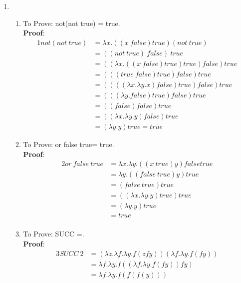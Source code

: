 \documentclass[11pt]{article}
\begin{document}
\begin{enumerate}
\item 
\begin{enumerate}
    \item To Prove: not(not true) = true.\\
          \textbf{Proof}: \begin{alignat*}{1}
                 not(not\:true)
                 &=  \lambda x.((x\:false)true)(not\:true) \\
                 &= ((not\:true)\:false)\:true \\
                &=  ((\lambda x.((x\:false) true) true)false) true \\
                 &= (((true\:false) true) false)true\\
                 &= ((((\lambda x. \lambda y.x) false) true)false) true\\
                &= (((\lambda y.false) true) false)true \\
                &= ((false) false) true \\
                &= ((\lambda x.\lambda y.y) false) true\\
                &= (\lambda y.y) true = true 
                \end{alignat*}
    \item To Prove: or false true= true.\\
          \textbf{Proof}:  \begin{alignat*}{2}
                or\:false\:true  &= \lambda x.\lambda y.((x\:true) y) false true \\
                    &= \lambda y.((false\:true) y) true\\
                    &= (false\:true) true\\
                    &= ((\lambda x.\lambda y.y) true) true\\
                    &= (\lambda y.y) true\\
                    &= true\\
            \end{alignat*}
    \item To Prove: SUCC =.\\
          \textbf{Proof}:  \begin{alignat*}{3}
                SUCC\:2  &= (\lambda z. \lambda f. \lambda y. f (z f y))(\lambda f. \lambda y. f (f y))\\
                        &=  \lambda f. \lambda y. f ( (\lambda f. \lambda y. f (f y)) f y)\\
                        &= \lambda f. \lambda y. f ( f(f(y)))\\

\end{alignat*}
\end{enumerate}
\end{enumerate}
\end{document}
